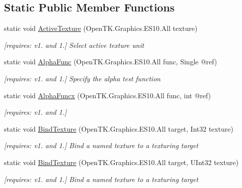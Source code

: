 \subsection*{Static Public Member Functions}
\begin{DoxyCompactItemize}
\item 
static void \hyperlink{class_open_t_k_1_1_graphics_1_1_e_s10_1_1_g_l_af877d36133b72c1317200aceaca0f2ff}{Active\-Texture} (Open\-T\-K.\-Graphics.\-E\-S10.\-All texture)
\begin{DoxyCompactList}\small\item\em \mbox{[}requires\-: v1. and 1.\mbox{]} Select active texture unit \end{DoxyCompactList}\item 
static void \hyperlink{class_open_t_k_1_1_graphics_1_1_e_s10_1_1_g_l_a9297ccb5a5c807f4618fb57a8069d884}{Alpha\-Func} (Open\-T\-K.\-Graphics.\-E\-S10.\-All func, Single @ref)
\begin{DoxyCompactList}\small\item\em \mbox{[}requires\-: v1. and 1.\mbox{]} Specify the alpha test function \end{DoxyCompactList}\item 
static void \hyperlink{class_open_t_k_1_1_graphics_1_1_e_s10_1_1_g_l_afdef691f4106bd823da7fa8c0eab7ee3}{Alpha\-Funcx} (Open\-T\-K.\-Graphics.\-E\-S10.\-All func, int @ref)
\begin{DoxyCompactList}\small\item\em \mbox{[}requires\-: v1. and 1.\mbox{]}\end{DoxyCompactList}\item 
static void \hyperlink{class_open_t_k_1_1_graphics_1_1_e_s10_1_1_g_l_a0315823b1e496999d48d9362c13bcee8}{Bind\-Texture} (Open\-T\-K.\-Graphics.\-E\-S10.\-All target, Int32 texture)
\begin{DoxyCompactList}\small\item\em \mbox{[}requires\-: v1. and 1.\mbox{]} Bind a named texture to a texturing target \end{DoxyCompactList}\item 
static void \hyperlink{class_open_t_k_1_1_graphics_1_1_e_s10_1_1_g_l_af0f9ba9d83688f66524fe5db5486942f}{Bind\-Texture} (Open\-T\-K.\-Graphics.\-E\-S10.\-All target, U\-Int32 texture)
\begin{DoxyCompactList}\small\item\em \mbox{[}requires\-: v1. and 1.\mbox{]} Bind a named texture to a texturing target \end{DoxyCompactList}\item 

\end{DoxyCompactItemize}
